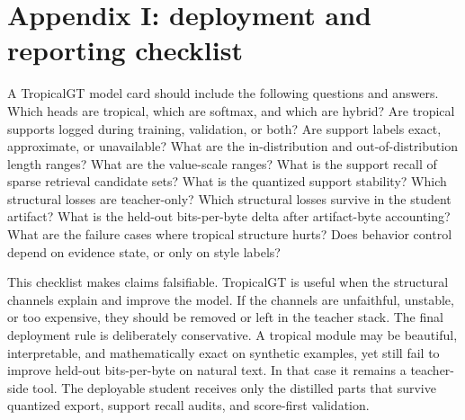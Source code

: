 \documentclass[11pt]{article}
\begin{document}
\newpage
\section{Appendix I: deployment and reporting checklist}

A TropicalGT model card should include the following questions and answers. Which heads are tropical, which are softmax, and which are hybrid? Are tropical supports logged during training, validation, or both? Are support labels exact, approximate, or unavailable? What are the in-distribution and out-of-distribution length ranges? What are the value-scale ranges? What is the support recall of sparse retrieval candidate sets? What is the quantized support stability? Which structural losses are teacher-only? Which structural losses survive in the student artifact? What is the held-out bits-per-byte delta after artifact-byte accounting? What are the failure cases where tropical structure hurts? Does behavior control depend on evidence state, or only on style labels?

This checklist makes claims falsifiable. TropicalGT is useful when the structural channels explain and improve the model. If the channels are unfaithful, unstable, or too expensive, they should be removed or left in the teacher stack. The final deployment rule is deliberately conservative. A tropical module may be beautiful, interpretable, and mathematically exact on synthetic examples, yet still fail to improve held-out bits-per-byte on natural text. In that case it remains a teacher-side tool. The deployable student receives only the distilled parts that survive quantized export, support recall audits, and score-first validation.
\end{document}
